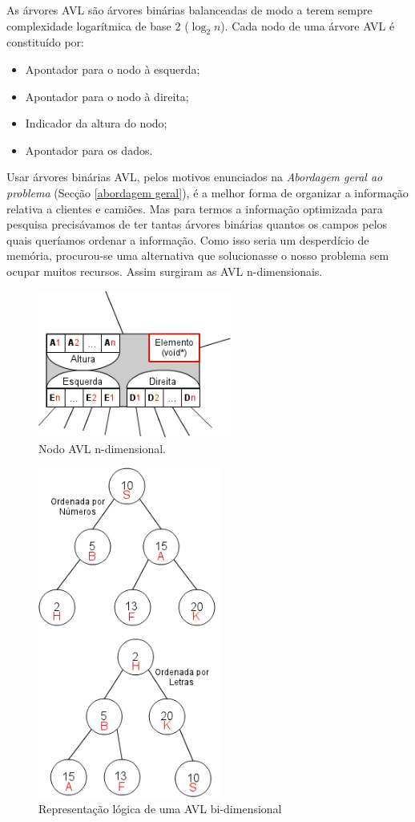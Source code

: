 \documentclass[a5paper,twocolumn, 11pt]{article}
\def\hyph{-\penalty0\hskip0pt\relax}
\begin{document}
As árvores AVL são árvores binárias balanceadas de modo a terem sempre complexidade logarítmica de base 2 ($\log_2 n$). Cada nodo de uma árvore AVL é constituído por:
\begin{itemize}
\item{Apontador para o nodo à esquerda;}
\item{Apontador para o nodo à direita;}
\item{Indicador da altura do nodo;}
\item{Apontador para os dados.}
\end{itemize}
Usar árvores binárias AVL, pelos motivos enunciados na \emph{Abordagem geral ao problema} (Secção \ref{abordagem geral}), é a melhor forma de organizar a informação relativa a clientes e camiões. Mas para termos a informação optimizada para pesquisa precisávamos de ter tantas árvores binárias quantos os campos pelos quais queríamos ordenar a informação. Como isso seria um desperdício de memória, procurou-se uma alternativa que solucionasse o nosso problema sem ocupar muitos recursos. Assim surgiram as AVL n\hyph{}dimensionais.
\begin{figure}[hbt]
    \caption[Nodo AVL n\hyph{}dimensional]{Nodo AVL n\hyph{}dimensional.}
    \label{nodo avl ndimensional}
    \centering
        \includegraphics[width=180pt]{nodo_ndavl.png}
\end{figure}
\begin{figure}[hbt]
    \caption[Representação lógica AVL bi\hyph{}dimensional]{Representação lógica de uma AVL bi\hyph{}dimensional}
    \label{duas avl comuns}
    \centering
        \includegraphics[width=170pt]{duas_avl_comuns.png}
\end{figure}
\end{document}
